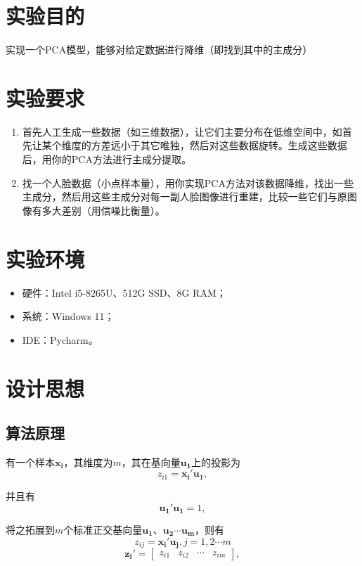 \documentclass[withoutpreface,bwprint]{cumcmthesis}
\begin{document}
\section{实验目的}
实现一个PCA模型，能够对给定数据进行降维（即找到其中的主成分）


\section{实验要求}
\begin{enumerate}
\item 首先人工生成一些数据（如三维数据），让它们主要分布在低维空间中，如首先让某个维度的方差远小于其它唯独，然后对这些数据旋转。生成这些数据后，用你的PCA方法进行主成分提取。
\item 找一个人脸数据（小点样本量），用你实现PCA方法对该数据降维，找出一些主成分，然后用这些主成分对每一副人脸图像进行重建，比较一些它们与原图像有多大差别（用信噪比衡量）。
\end{enumerate}

\section{实验环境}
\begin{itemize}
\setlength{\itemindent}{1.5em}
\item 硬件：Intel i5-8265U、512G SSD、8G RAM；
\item 系统：Windows 11；
\item IDE：Pycharm。
\end{itemize}

\section{设计思想}
\subsection{算法原理}
有一个样本$\boldsymbol{x_{i}}$，其维度为$m$，其在基向量$\boldsymbol{u_{1}}$上的投影为
\begin{equation*}
z_{i1}=\boldsymbol{x_{i}'}\boldsymbol{u_{1}},
\end{equation*}

并且有
\begin{equation*}
\boldsymbol{u_{1}'}\boldsymbol{u_{1}}=1,
\end{equation*}

将之拓展到$m$个标准正交基向量$\boldsymbol{u_{1}}$、$\boldsymbol{u_{2}}\cdots\boldsymbol{u_{m}}$，则有
\begin{equation*}
z_{ij}=\boldsymbol{x_{i}'}\boldsymbol{u_{j}},j=1,2\cdots m
\end{equation*}
\begin{equation*}
\boldsymbol{z_{i}'}=\begin{bmatrix}z_{i1}&z_{i2}&\cdots&z_{im}\end{bmatrix},
\end{equation*}
\end{document}
